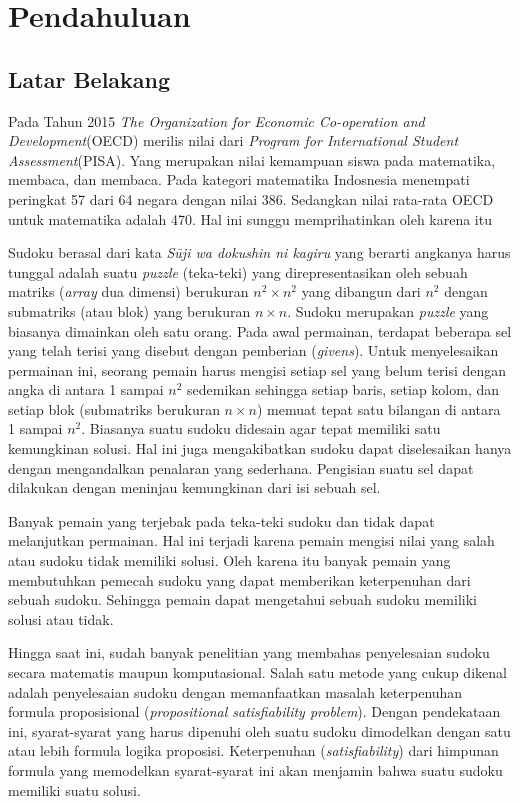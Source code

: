 \chapter{Pendahuluan}

\section{Latar Belakang}

Pada Tahun 2015 \textit{The Organization for Economic Co-operation and Development}(OECD) merilis nilai dari \textit{Program for International Student Assessment}(PISA). Yang merupakan nilai kemampuan siswa pada matematika, membaca, dan membaca. Pada kategori matematika Indosnesia menempati peringkat 57 dari 64 negara dengan nilai 386. Sedangkan nilai rata-rata OECD untuk matematika adalah 470. Hal ini sunggu memprihatinkan oleh karena itu 

Sudoku berasal dari kata \textit{Sūji wa dokushin ni kagiru} yang berarti angkanya harus tunggal\cite{SATPy3} adalah suatu \textit{puzzle} (teka-teki) yang direpresentasikan oleh sebuah matriks (\textit{array}
dua dimensi) berukuran ${n^2 \times n^2}$  yang dibangun dari ${n^2}$ dengan submatriks (atau blok)
yang berukuran ${n \times n}$. Sudoku merupakan \textit{puzzle}
yang biasanya dimainkan oleh satu orang.  Pada
awal permainan, terdapat beberapa sel yang telah terisi yang disebut dengan pemberian
(\textit{givens}). Untuk menyelesaikan permainan ini, seorang pemain harus mengisi setiap sel yang
belum terisi dengan angka di antara 1 sampai
$n^2$ sedemikan sehingga setiap baris, setiap kolom,
dan setiap blok (submatriks berukuran $n \times n$) memuat tepat satu bilangan di antara 1 sampai $n^2$. Biasanya suatu sudoku didesain agar tepat memiliki satu kemungkinan solusi. Hal
ini juga mengakibatkan sudoku dapat diselesaikan hanya dengan mengandalkan penalaran
yang sederhana. Pengisian suatu sel dapat dilakukan dengan meninjau kemungkinan dari
isi sebuah sel.

Banyak pemain yang terjebak pada teka-teki sudoku dan tidak dapat melanjutkan permainan. Hal ini terjadi karena pemain mengisi nilai yang salah atau sudoku tidak memiliki solusi. Oleh karena itu banyak pemain yang membutuhkan pemecah sudoku yang dapat memberikan keterpenuhan dari sebuah sudoku. Sehingga pemain dapat mengetahui sebuah sudoku memiliki solusi atau tidak.

Hingga saat ini, sudah banyak penelitian yang membahas penyelesaian sudoku secara
matematis maupun komputasional. Salah satu metode yang cukup dikenal adalah penyelesaian
sudoku dengan memanfaatkan masalah keterpenuhan formula proposisional (\textit{propositional satisfiability problem}). Dengan pendekataan ini, syarat-syarat yang
harus dipenuhi oleh suatu sudoku dimodelkan dengan satu atau lebih formula logika proposisi\cite{KJ06,LO06}.
Keterpenuhan (\textit{satisfiability}) dari himpunan formula yang memodelkan syarat-syarat
ini akan menjamin bahwa suatu sudoku memiliki suatu solusi.

